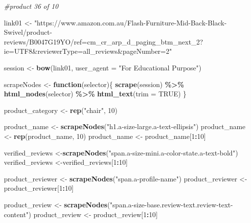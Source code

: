 \documentclass[
]{article}
\newenvironment{Shaded}{\begin{snugshade}}{\end{snugshade}}
\newcommand{\AttributeTok}[1]{\textcolor[rgb]{0.13,0.29,0.53}{#1}}
\newcommand{\CommentTok}[1]{\textcolor[rgb]{0.56,0.35,0.01}{\textit{#1}}}
\newcommand{\ConstantTok}[1]{\textcolor[rgb]{0.56,0.35,0.01}{#1}}
\newcommand{\ControlFlowTok}[1]{\textcolor[rgb]{0.13,0.29,0.53}{\textbf{#1}}}
\newcommand{\DecValTok}[1]{\textcolor[rgb]{0.00,0.00,0.81}{#1}}
\newcommand{\FunctionTok}[1]{\textcolor[rgb]{0.13,0.29,0.53}{\textbf{#1}}}
\newcommand{\NormalTok}[1]{#1}
\newcommand{\OtherTok}[1]{\textcolor[rgb]{0.56,0.35,0.01}{#1}}
\newcommand{\SpecialCharTok}[1]{\textcolor[rgb]{0.81,0.36,0.00}{\textbf{#1}}}
\newcommand{\StringTok}[1]{\textcolor[rgb]{0.31,0.60,0.02}{#1}}
\begin{document}
\begin{Shaded}
\begin{Highlighting}[]
\CommentTok{\#product 36 of 10}

\NormalTok{link01 }\OtherTok{\textless{}{-}} \StringTok{"https://www.amazon.com.au/Flash{-}Furniture{-}Mid{-}Back{-}Black{-}Swivel/product{-}reviews/B0047G19YO/ref=cm\_cr\_arp\_d\_paging\_btm\_next\_2?ie=UTF8\&reviewerType=all\_reviews\&pageNumber=2"}


\NormalTok{  session }\OtherTok{\textless{}{-}} \FunctionTok{bow}\NormalTok{(link01,}
               \AttributeTok{user\_agent =} \StringTok{"For Educational Purpose"}\NormalTok{)}

\NormalTok{  scrapeNodes }\OtherTok{\textless{}{-}} \ControlFlowTok{function}\NormalTok{(selector)\{}
    \FunctionTok{scrape}\NormalTok{(session) }\SpecialCharTok{\%\textgreater{}\%}
      \FunctionTok{html\_nodes}\NormalTok{(selector) }\SpecialCharTok{\%\textgreater{}\%}
      \FunctionTok{html\_text}\NormalTok{(}\AttributeTok{trim =} \ConstantTok{TRUE}\NormalTok{)}
\NormalTok{  \}}

\NormalTok{  product\_category }\OtherTok{\textless{}{-}} \FunctionTok{rep}\NormalTok{(}\StringTok{"chair"}\NormalTok{, }\DecValTok{10}\NormalTok{)}

\NormalTok{  product\_name }\OtherTok{\textless{}{-}} \FunctionTok{scrapeNodes}\NormalTok{(}\StringTok{"h1.a{-}size{-}large.a{-}text{-}ellipsis"}\NormalTok{)}
\NormalTok{  product\_name }\OtherTok{\textless{}{-}} \FunctionTok{rep}\NormalTok{(product\_name, }\DecValTok{10}\NormalTok{)}
\NormalTok{  product\_name }\OtherTok{\textless{}{-}}\NormalTok{ product\_name[}\DecValTok{1}\SpecialCharTok{:}\DecValTok{10}\NormalTok{]}
  
\NormalTok{  verified\_reviews }\OtherTok{\textless{}{-}}\FunctionTok{scrapeNodes}\NormalTok{(}\StringTok{"span.a{-}size{-}mini.a{-}color{-}state.a{-}text{-}bold"}\NormalTok{)}
\NormalTok{  verified\_reviews }\OtherTok{\textless{}{-}}\NormalTok{verified\_reviews[}\DecValTok{1}\SpecialCharTok{:}\DecValTok{10}\NormalTok{]}
  
\NormalTok{  product\_reviewer }\OtherTok{\textless{}{-}} \FunctionTok{scrapeNodes}\NormalTok{(}\StringTok{"span.a{-}profile{-}name"}\NormalTok{)}
\NormalTok{  product\_reviewer }\OtherTok{\textless{}{-}}\NormalTok{ product\_reviewer[}\DecValTok{1}\SpecialCharTok{:}\DecValTok{10}\NormalTok{]}
  
\NormalTok{  product\_review }\OtherTok{\textless{}{-}} \FunctionTok{scrapeNodes}\NormalTok{(}\StringTok{"span.a{-}size{-}base.review{-}text.review{-}text{-}content"}\NormalTok{)}
\NormalTok{  product\_review }\OtherTok{\textless{}{-}}\NormalTok{ product\_review[}\DecValTok{1}\SpecialCharTok{:}\DecValTok{10}\NormalTok{]}
  

\end{Highlighting}
\end{Shaded}
\end{document}
